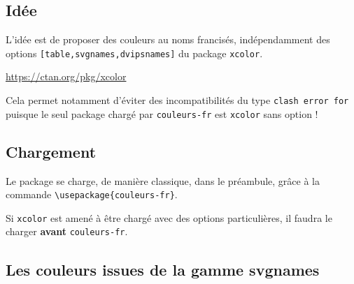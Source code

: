 \documentclass{article}
\begin{document}
\subsection{Idée}

L'idée est de proposer des couleurs au noms francisés, indépendamment des options \texttt{[table,svgnames,dvipsnames]} du package \texttt{xcolor}.

\smallskip

\hfill\url{https://ctan.org/pkg/xcolor}\hfill~

\smallskip

Cela permet notamment d'éviter des incompatibilités du type \texttt{clash error for} puisque le seul package chargé par \texttt{couleurs-fr} est \texttt{xcolor} sans option !

\subsection{Chargement}

Le package se charge, de manière classique, dans le préambule, grâce à la commande \verb+\usepackage{couleurs-fr}+.

Si \texttt{xcolor} est amené à être chargé avec des options particulières, il faudra le charger \textbf{avant} \texttt{couleurs-fr}.

\pagebreak

\subsection{Les couleurs issues de la gamme \og svgnames \fg}
\end{document}
